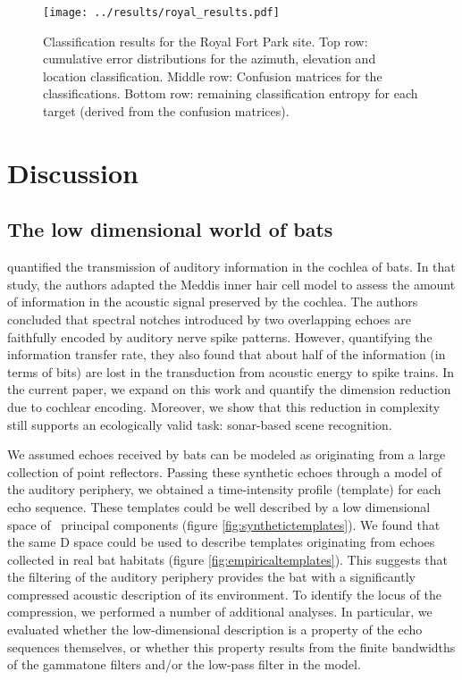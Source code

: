 \documentclass[preprint,5p]{elsarticle}
\begin{document}
\begin{figure}
	\centering
	\texttt{[image: ../results/royal\_results.pdf]}
	\caption{Classification results for the Royal Fort Park site. Top row: cumulative error distributions for the azimuth, elevation and location classification. Middle row: Confusion matrices for the classifications. Bottom row: remaining classification entropy for each target (derived from the confusion matrices).}
	\label{fig:royalperformance}
\end{figure}


\section{Discussion}

\subsection{The low dimensional world of bats}

\citet{Reijniers2010a} quantified the transmission of auditory information in the cochlea of bats. In that study, the authors adapted the Meddis inner hair cell model \citep{Meddis2006} to assess the amount of information in the acoustic signal preserved by the cochlea. The authors concluded that spectral notches introduced by two overlapping echoes are faithfully encoded by auditory nerve spike patterns. However, quantifying the information transfer rate, they also found that about half of the information (in terms of bits) are lost in the transduction from acoustic energy to spike trains. In the current paper, we expand on this work and quantify the dimension reduction due to cochlear encoding. Moreover, we show that this reduction in complexity still supports an ecologically valid task: sonar-based scene recognition.

We assumed echoes received by bats can be modeled as originating from a large collection of point reflectors. Passing these synthetic echoes through a model of the auditory periphery, we obtained a time-intensity profile (template) for each echo sequence. These templates could be well described by a low dimensional space of \pca\ principal components (figure \ref{fig:synthetictemplates}). We found that the same \pca D space could be used to describe templates originating from echoes collected in real bat habitats (figure \ref{fig:empiricaltemplates}). This suggests that the filtering of the auditory periphery provides the bat with a significantly compressed acoustic description of its environment. To identify the locus of the compression, we performed a number of additional analyses. In particular, we evaluated whether the low-dimensional description is a property of the echo sequences themselves, or whether this property results from the finite bandwidths of the gammatone filters and/or the low-pass filter in the \citet{Wiegrebe2008} model.
\end{document}
